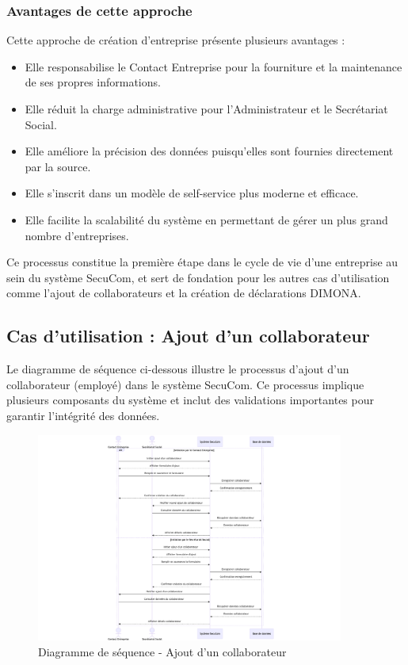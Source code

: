 \subsubsection{Avantages de cette approche}

Cette approche de création d'entreprise présente plusieurs avantages :
\begin{itemize}
  \item Elle responsabilise le Contact Entreprise pour la fourniture et la maintenance de ses propres informations.
  \item Elle réduit la charge administrative pour l'Administrateur et le Secrétariat Social.
  \item Elle améliore la précision des données puisqu'elles sont fournies directement par la source.
  \item Elle s'inscrit dans un modèle de self-service plus moderne et efficace.
  \item Elle facilite la scalabilité du système en permettant de gérer un plus grand nombre d'entreprises.
\end{itemize}

Ce processus constitue la première étape dans le cycle de vie d'une entreprise au sein du système SecuCom, et sert de fondation pour les autres cas d'utilisation comme l'ajout de collaborateurs et la création de déclarations DIMONA.

\subsection{Cas d'utilisation : Ajout d'un collaborateur}

Le diagramme de séquence ci-dessous illustre le processus d'ajout d'un collaborateur (employé) dans le système SecuCom. Ce processus implique plusieurs composants du système et inclut des validations importantes pour garantir l'intégrité des données.

\begin{figure}[h]
\centering
\includegraphics[width=0.9\textwidth]{SD_creation_collaborateur.png}
\caption{Diagramme de séquence - Ajout d'un collaborateur}
\end{figure}

